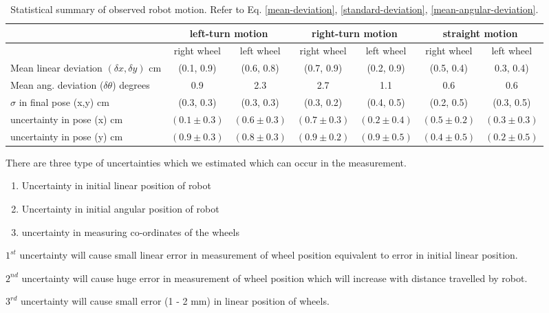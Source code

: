 \begin{table}[H]
	\centering
	\begin{tabular}{| l | c | c | c | c | c | c |}
		\hline
		& \multicolumn{2}{c|}{left-turn motion} & \multicolumn{2}{c|}{ right-turn motion} & \multicolumn{2}{c|}{straight motion} \\
		\hline
		& right wheel & left wheel & right wheel & left wheel & right wheel & left wheel \\
		\hline
		Mean linear deviation $(\delta x, \delta y)$ cm & (0.1, 0.9) & (0.6, 0.8)
		& (0.7, 0.9) & (0.2, 0.9) & (0.5, 0.4) & 0.3, 0.4) \\
		\hline
		Mean ang. deviation ($\delta \theta$) degrees & 0.9 & 2.3 & 2.7 & 1.1 & 0.6 & 0.6 \\
		\hline
		$\sigma$ in final pose (x,y) cm & (0.3, 0.3) & (0.3, 0.3) & (0.3, 0.2) & (0.4, 0.5) & (0.2, 0.5) & (0.3, 0.5)\\
		\hline
		uncertainty in pose (x) cm & $(0.1 \pm 0.3)$ & $(0.6 \pm 0.3)$ & $(0.7 \pm 0.3)$ & $(0.2 \pm 0.4)$ & $(0.5 \pm 0.2)$ & $(0.3 \pm 0.3)$ \\
		uncertainty in pose (y) cm & $(0.9 \pm 0.3)$ & $(0.8 \pm 0.3)$ & $(0.9 \pm 0.2)$ & $(0.9 \pm 0.5)$ & $(0.4 \pm 0.5)$ & $(0.2 \pm 0.5)$ \\
		\hline
	\end{tabular}
	\caption{Statistical summary of observed robot motion. Refer to Eq. \ref{mean-deviation}, \ref{standard-deviation}, \ref{mean-angular-deviation}.}
	\label{stats}
\end{table}
There are three type of uncertainties which we estimated which can occur in the measurement. 
\begin{enumerate}
	\item Uncertainty in initial linear position of robot
	\item Uncertainty in initial angular position of robot
	\item uncertainty in measuring co-ordinates of the wheels
\end{enumerate}   

$1^{st}$ uncertainty will cause small linear error in measurement of wheel position equivalent to error in initial linear position.

$2^{nd}$ uncertainty will cause huge error in measurement of wheel position which will increase with distance travelled by robot. 

$3^{rd}$ uncertainty will cause small error (1 - 2 mm) in linear position of wheels.

